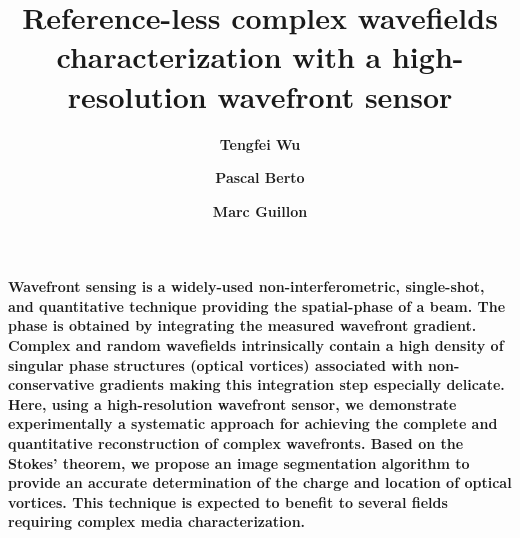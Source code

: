 \documentclass[10pt,twocolumn,twoside,letterpaper]{article}
\begin{document}
\title{Reference-less complex wavefields characterization with a high-resolution wavefront sensor}


\author[1,2,3]{\bf Tengfei Wu}
\author[2,3]{\bf Pascal Berto}
\author[1,3,4,*]{\bf Marc Guillon}



\maketitle




\begin{strip}
\textbf{
Wavefront sensing is a widely-used non-interferometric, single-shot, and quantitative technique providing the spatial-phase of a beam. The phase is obtained by integrating the measured wavefront gradient.
Complex and random wavefields intrinsically contain a high density of singular phase structures (optical vortices) associated with non-conservative gradients making this integration step especially delicate.
Here, using a high-resolution wavefront sensor, we demonstrate experimentally a systematic approach for achieving the complete and quantitative reconstruction of complex wavefronts. 
Based on the Stokes' theorem, we propose an image segmentation algorithm to provide an accurate determination of the charge and location of optical vortices. This technique is expected to benefit to several fields requiring complex media characterization.}
\end{strip}
\end{document}
